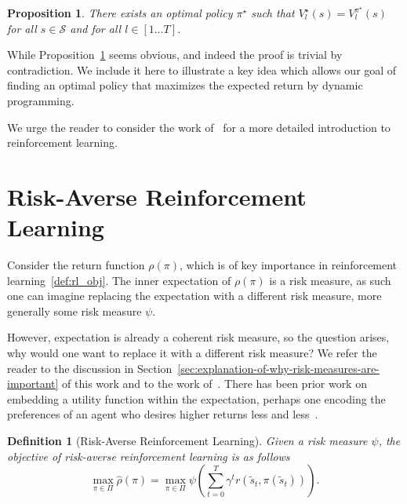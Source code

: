 \documentclass[10pt]{article}
\newtheorem{definition}{Definition}
\renewcommand{\cite}{\citep}
\theoremstyle{plain}
\newtheorem{proposition}{Proposition}
\theoremstyle{remark}
\begin{document}
\begin{proposition}\label{prop:optimal_policy_value}
        There exists an optimal policy $\pi^\star$ such that $V^\star_l(s) = V^{\pi^\star}_l(s)$ for all $s \in \mathcal{S}$ and for all $l \in [1\ldots T]$.
\end{proposition}

While Proposition~\ref{prop:optimal_policy_value} seems obvious, and indeed the proof is trivial by contradiction. We include it here to illustrate a key idea which allows our goal of finding an optimal policy that maximizes the expected return by dynamic programming.

We urge the reader to consider the work of~\cite{sutton2018} for a more detailed introduction to reinforcement learning.

\section{Risk-Averse Reinforcement Learning}

Consider the return function $\rho(\pi)$, which is of key importance in reinforcement learning~\ref{def:rl_obj}. 
The inner expectation of $\rho(\pi)$ is a risk measure, as such one can imagine replacing the expectation
with a different risk measure, more generally some risk measure $\psi$.


However, expectation is already a coherent risk measure, so the question arises, why would one want to replace it with a different risk measure? 
We refer the reader to the discussion in Section~\ref{sec:explanation-of-why-risk-measures-are-important} of this
work and to the work of~\cite{Bauerle2011, follmer2016, howard1972}. 
There has been prior work on embedding a utility function within the expectation, perhaps one encoding the preferences of an agent who
desires higher returns less and less~\cite{howard1972}. 

\begin{definition}[Risk-Averse Reinforcement Learning]\label{def:risk_averse_rl}
        Given a risk measure $\psi$, the objective of risk-averse reinforcement learning is as follows
        \[
        \max_{\pi \in \Pi} \hat{\rho}(\pi) = \max_{\pi \in \Pi} \psi \left( \sum_{t=0}^{T} \gamma^t r(\tilde{s}_t, \pi(\tilde{s}_t)) \right).
        \]
\end{definition}
\end{document}
